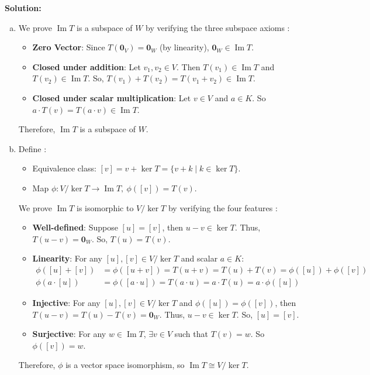 \documentclass{article}
\DeclareMathOperator{\Ima}{\mathrm{Im}}
\newenvironment{solution}{\color{blue} \smallskip \textbf{Solution:}}{}
\begin{document}
\begin{enumerate}
\begin{solution}
\begin{enumerate}[(a)]
            \item We prove $\Ima T$ is a subspace of $W$ by verifying the three subspace axioms :
            \begin{itemize}
                \item \textbf{Zero Vector}: Since $T(\mathbf{0}_V)=\mathbf{0}_W$ (by linearity), $\mathbf{0}_W \in \Ima T$.
                \item \textbf{Closed under addition}:
                Let $v_1, v_2 \in V$. 
                Then $T(v_1) \in \Ima T$ and $T(v_2) \in \Ima T$. 
                So, $T(v_1) + T(v_2) = T(v_1 + v_2) \in \Ima T$.
                \item \textbf{Closed under scalar multiplication}:
                Let $v \in V$ and $a \in K$.
                So $a \cdot T(v) = T(a \cdot v) \in \Ima T$.
            \end{itemize}
            Therefore, $\Ima T$ is a subspace of $W$.

            \item Define : 
            \begin{itemize}
                \item Equivalence class: $[v] = v + \ker T = \{ v + k \mid k \in \ker T\}$.
                \item Map $\phi \colon V / \ker T \to \Ima T, \ \phi([v]) = T(v)$.
            \end{itemize}
            We prove $\Ima T$ is isomorphic to $V / \ker T$ by verifying the four features :
            \begin{itemize}
                \item \textbf{Well-defined}: 
                Suppose $[u]=[v]$, then $u - v \in \ker T$. Thus, $T(u - v) = \mathbf{0}_W$. So, $T(u) = T(v)$.
                \item \textbf{Linearity}:
                For any $[u], [v] \in V / \ker T$ and scalar $a \in K$:
                \begin{align*}
                    \phi([u] + [v]) &= \phi([u + v]) = T(u + v) = T(u) + T(v) = \phi([u]) + \phi([v]) \\
                    \phi(a \cdot [u]) &= \phi([a \cdot u]) = T(a \cdot u) = a \cdot T(u) = a \cdot \phi([u])
                \end{align*}
                \item \textbf{Injective}:
                For any $[u], [v] \in V / \ker T$ and $\phi([u]) = \phi([v])$, then $T(u - v) = T(u) - T(v) = \mathbf{0}_W$. Thus, $u - v \in \ker T$. So, $[u]=[v]$.
                \item \textbf{Surjective}:
                For any $w \in \Ima T$, $\exists v \in V$ such that $T(v) = w$. So $\phi([v])=w$.
            \end{itemize}
            Therefore, \(\phi\) is a vector space isomorphism, so \(\Ima T \cong V / \ker T\).
            

\end{enumerate}
\end{solution}
\end{enumerate}
\end{document}
